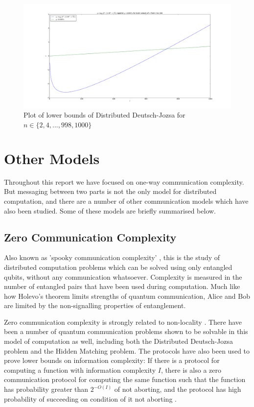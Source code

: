 \documentclass[a4paper]{article}
\begin{document}
        \begin{figure}
            \includegraphics[width=\linewidth]{ddj_bound}
            \caption{Plot of lower bounds of Distributed Deutsch-Jozsa for $n \in \{2, 4,..., 998, 1000\}$}
            \label{fig:ddj-bound}
        \end{figure}

    \section{Other Models}
    \label{sec:other-models}

        Throughout this report we have focused on one-way communication complexity. But messaging between two parts is not the only model for distributed computation, and there are a number of other communication models which have also been studied. Some of these models are briefly summarised below.

        \subsection{Zero Communication Complexity}

        Also known as 'spooky communication complexity' \cite{quant-ph/0101005}, this is the study of distributed computation problems which can be solved using only entangled qubits, without any communication whatsoever. Complexity is measured in the number of entangled pairs that have been used during computation. Much like how Holevo's theorem limits strengths of quantum communication, Alice and Bob are limited by the non-signalling properties of entanglement.

        Zero communication complexity is strongly related to non-locality \cite{RevModPhys.82.665}. There have been a number of quantum communication problems shown to be solvable in this model of computation as well, including both the Distributed Deutsch-Jozsa problem and the Hidden Matching problem. The protocols have also been used to prove lower bounds on information complexity: If there is a protocol for computing a function with information complexity $I$, there is also a zero communication protocol for computing the same function such that the function has probability greater than $2^{-O(I)}$ of not aborting, and the protocol has high probability of succeeding on condition of it not aborting \cite{Kerenidis:2012:LBI:2417500.2417819}.
\end{document}
